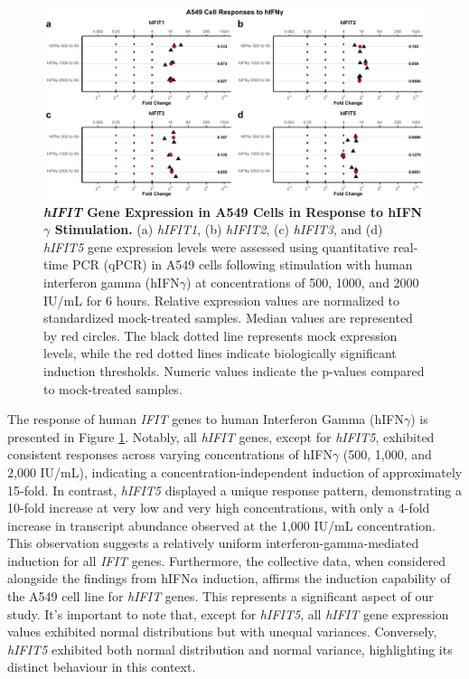 \begin{figure}
    \centering
    \includegraphics[width=1\linewidth]{06. Chapter 1/Figs/01. Induction/02. a549_treat_ifng.pdf}
    \caption[\textit{hIFIT} Gene Expression in A549 Cells in Response to hIFN\(\gamma\) Stimulation.]{\textbf{\textit{hIFIT} Gene Expression in A549 Cells in Response to hIFN\(\gamma\) Stimulation.} (a) \textit{hIFIT1}, (b) \textit{hIFIT2}, (c) \textit{hIFIT3}, and (d) \textit{hIFIT5} gene expression levels were assessed using quantitative real-time PCR (qPCR) in A549 cells following stimulation with human interferon gamma (hIFN\(\gamma\)) at concentrations of 500, 1000, and 2000 IU/mL for 6 hours. Relative expression values are normalized to standardized mock-treated samples. Median values are represented by red circles. The black dotted line represents mock expression levels, while the red dotted lines indicate biologically significant induction thresholds. Numeric values indicate the p-values compared to mock-treated samples.}
    \label{fig:A549 Response to hIFNg}
\end{figure}

The response of human \textit{IFIT} genes to human Interferon Gamma (hIFN\(\gamma\)) is presented in Figure \ref{fig:A549 Response to hIFNg}. Notably, all \textit{hIFIT} genes, except for \textit{hIFIT5}, exhibited consistent responses across varying concentrations of hIFN\(\gamma\) (500, 1,000, and 2,000 IU/mL), indicating a concentration-independent induction of approximately 15-fold. In contrast, \textit{hIFIT5} displayed a unique response pattern, demonstrating a 10-fold increase at very low and very high concentrations, with only a 4-fold increase in transcript abundance observed at the 1,000 IU/mL concentration. This observation suggests a relatively uniform interferon-gamma-mediated induction for all \textit{IFIT} genes. Furthermore, the collective data, when considered alongside the findings from hIFN\(\alpha\) induction, affirms the induction capability of the A549 cell line for \textit{hIFIT} genes. This represents a significant aspect of our study. It's important to note that, except for \textit{hIFIT5}, all \textit{hIFIT} gene expression values exhibited normal distributions but with unequal variances. Conversely, \textit{hIFIT5} exhibited both normal distribution and normal variance, highlighting its distinct behaviour in this context.

